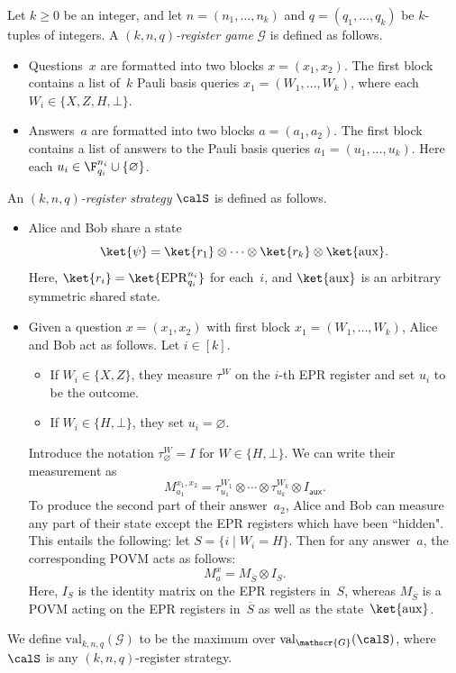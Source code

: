 \documentclass[11pt]{article}
\newcommand{\hideq}{H}
\newcommand{\noop}{\bot}
\newcommand{\game}{\mathscr{G}}
\newcommand{\valstrat}[2]{\mathrm{val}_{#1}(#2)}
\newcommand{\valreg}[2]{\mathrm{val}_{#1}(#2)}
\newcommand{\reg}[1]{{\mathsf{#1}}}
\begin{document}
\begin{definition}\label{def:register}
Let $k \geq 0$ be an integer, and let $n = (n_1, \ldots, n_k)$ and $q = (q_1, \ldots, q_k)$ be $k$-tuples of integers.
A \emph{$(k, n, q)$-register game} $\game$ is defined as follows.
\begin{itemize}
\itemsep -.5pt
\item[$\circ$] Questions~$x$ are formatted into two blocks $x = (x_1, x_2)$. The first block contains a list of~$k$ Pauli basis queries
			$x_1 = (W_1, \ldots, W_k)$, where each $W_i \in \{X, Z, \hideq, \noop\}$.
\item[$\circ$] Answers~$a$ are formatted into two blocks $a = (a_1, a_2)$. The first block contains a list of answers to the Pauli basis queries $a_1 = (u_1, \ldots, u_k)$.
			Here each $u_i  \in \F_{q_i}^{n_i} \cup \{\varnothing\}$.
\end{itemize}
An \emph{$(k, n, q)$-register strategy} $\calS$ is defined as follows.
\begin{itemize}
\itemsep -.5pt
\item[$\circ$] Alice and Bob share a state
\begin{equation*}
\ket{\psi} = \ket{r_1} \otimes \cdots \otimes \ket{r_k} \otimes \ket{\mathrm{aux}}.
\end{equation*}
Here, $\ket{r_i} = \ket{\mathrm{EPR}_{q_i}^{n_i}}$ for each~$i$, and $\ket{\mathrm{aux}}$ is an arbitrary symmetric shared state.
\item[$\circ$] Given a question $x = (x_1, x_2)$ with first block $x_1 = (W_1, \ldots, W_k)$, Alice and Bob act as follows.
	Let $i \in [k]$.
	\begin{itemize}
	\item If $W_i \in \{X, Z\}$, they measure $\tau^{W}$ on the $i$-th EPR register and set $u_i$ to be the outcome.
	\item If $W_i \in \{\hideq, \noop\}$, they set $u_i = \varnothing$.
	\end{itemize}
	Introduce the notation $\tau_{\varnothing}^W = I$ for $W \in \{\hideq, \noop\}$.
	We can write their measurement as
	\begin{equation}\label{eq:in-math}
		M^{x_1, x_2}_{a_1} = \tau^{W_1}_{u_1} \otimes \cdots \otimes \tau^{W_k}_{u_k} \otimes I_{\reg{aux}}.
	\end{equation}
	To produce the second part of their answer~$a_2$, Alice and Bob can measure any part of their state except the EPR registers which have been ``hidden".	
	This entails the following: let $S = \{i \mid W_i = \hideq\}$.  Then for any answer~$a$, the corresponding POVM acts as follows:
	\begin{equation}\label{eq:hide-coords-in-S}
	M_a^x = M_{\overline{S}} \otimes I_{S}.
	\end{equation}
	Here, $I_{S}$ is the identity matrix on the EPR registers in~$S$,
	whereas $M_{\overline{S}}$ is a POVM acting on the EPR registers in~$\overline{S}$ as well as the state~$\ket{\mathrm{aux}}$.
\end{itemize}
We define $\valreg{k,n,q}{\game}$ to be the maximum over $\valstrat{\game}{\calS}$, where $\calS$ is any $(k, n, q)$-register strategy.
\end{definition}
\end{document}
